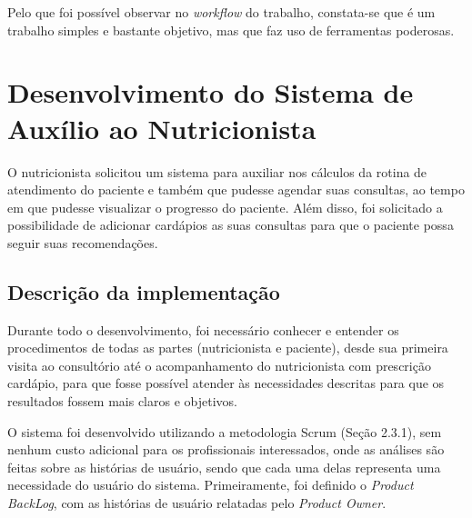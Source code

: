 \documentclass[
	12pt,				%
    oneside,			%
	a4paper,			%
	english,			%
	french,				%
	spanish,			%
	brazil,				%
	]{abntex2}
\begin{document}
Pelo que foi possível observar no \textit{workflow} do trabalho, constata-se que é um trabalho simples e bastante objetivo, mas que faz uso de ferramentas poderosas.



\chapter{Desenvolvimento do Sistema de Auxílio ao Nutricionista}

O nutricionista solicitou um sistema para auxiliar nos cálculos da rotina
de atendimento do paciente e também que pudesse agendar suas consultas, ao
tempo em que pudesse visualizar o progresso do paciente. Além disso, foi solicitado a possibilidade de adicionar cardápios as suas consultas para que o paciente possa seguir
suas recomendações.

\section{Descrição da implementação}

Durante todo o desenvolvimento, foi necessário conhecer e entender os
procedimentos de todas as partes (nutricionista e paciente), desde sua primeira visita
ao consultório até o acompanhamento do nutricionista com prescrição cardápio, para
que fosse possível atender às necessidades descritas para que os resultados
fossem mais claros e objetivos.

O sistema foi desenvolvido utilizando a metodologia Scrum (Seção 2.3.1), sem nenhum custo adicional
para os profissionais interessados, onde as análises são feitas sobre as histórias de usuário, sendo que cada uma delas
representa uma necessidade do usuário do sistema. Primeiramente, foi definido o
\textit{Product BackLog}, com as histórias de usuário relatadas pelo \textit{Product Owner}.
\end{document}

